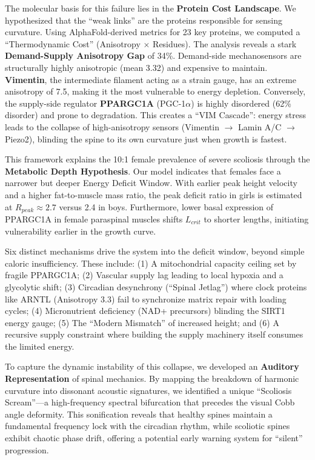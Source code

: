\documentclass[12pt]{article}
\begin{document}
The molecular basis for this failure lies in the \textbf{Protein Cost Landscape}. We hypothesized that the ``weak links'' are the proteins responsible for sensing curvature. Using AlphaFold-derived metrics for 23 key proteins, we computed a ``Thermodynamic Cost'' (Anisotropy $\times$ Residues). The analysis reveals a stark \textbf{Demand-Supply Anisotropy Gap} of 34\%. Demand-side mechanosensors are structurally highly anisotropic (mean 3.32) and expensive to maintain. \textbf{Vimentin}, the intermediate filament acting as a strain gauge\cite{wuest2025}, has an extreme anisotropy of 7.5, making it the most vulnerable to energy depletion. Conversely, the supply-side regulator \textbf{PPARGC1A} (PGC-1$\alpha$) is highly disordered (62\% disorder) and prone to degradation. This creates a ``VIM Cascade'': energy stress leads to the collapse of high-anisotropy sensors (Vimentin $\to$ Lamin A/C $\to$ Piezo2), blinding the spine to its own curvature just when growth is fastest.

This framework explains the 10:1 female prevalence of severe scoliosis through the \textbf{Metabolic Depth Hypothesis}. Our model indicates that females face a narrower but deeper Energy Deficit Window. With earlier peak height velocity and a higher fat-to-muscle mass ratio, the peak deficit ratio in girls is estimated at $R_{peak} \approx 2.7$ versus 2.4 in boys. Furthermore, lower basal expression of PPARGC1A in female paraspinal muscles\cite{handschin2024} shifts $L_{crit}$ to shorter lengths, initiating vulnerability earlier in the growth curve.

Six distinct mechanisms drive the system into the deficit window, beyond simple caloric insufficiency. These include: (1) A mitochondrial capacity ceiling set by fragile PPARGC1A; (2) Vascular supply lag leading to local hypoxia and a glycolytic shift; (3) Circadian desynchrony (``Spinal Jetlag'') where clock proteins like ARNTL (Anisotropy 3.3) fail to synchronize matrix repair with loading cycles\cite{dudek2017}; (4) Micronutrient deficiency (NAD+ precursors) blinding the SIRT1 energy gauge; (5) The ``Modern Mismatch'' of increased height; and (6) A recursive supply constraint where building the supply machinery itself consumes the limited energy.

To capture the dynamic instability of this collapse, we developed an \textbf{Auditory Representation} of spinal mechanics. By mapping the breakdown of harmonic curvature into dissonant acoustic signatures, we identified a unique ``Scoliosis Scream''—a high-frequency spectral bifurcation that precedes the visual Cobb angle deformity. This sonification reveals that healthy spines maintain a fundamental frequency lock with the circadian rhythm, while scoliotic spines exhibit chaotic phase drift, offering a potential early warning system for ``silent'' progression.
\end{document}

